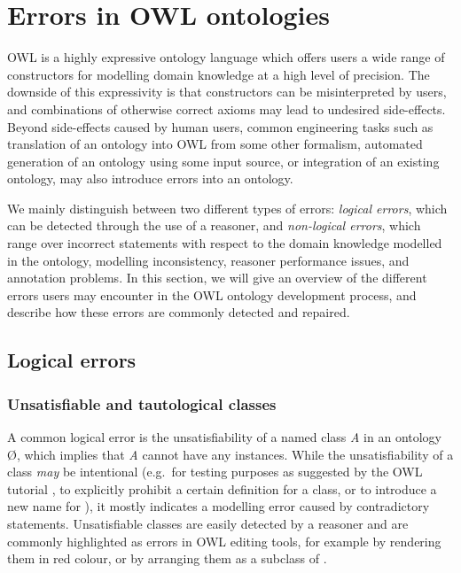 \section{Errors in OWL ontologies}

OWL is a highly expressive ontology language which offers users a wide range of constructors for modelling domain knowledge at a high level of precision. The downside of this expressivity is that constructors can be misinterpreted by users, and combinations of otherwise correct axioms may lead to undesired side-effects. Beyond side-effects caused by human users, common engineering tasks such as translation of an ontology into OWL from some other formalism, automated generation of an ontology using some input source, or integration of an existing ontology, may also introduce errors into an ontology.

We mainly distinguish between two different types of errors: \emph{logical errors}, which can be detected through the use of a reasoner, and \emph{non-logical errors}, which range over incorrect statements with respect to the domain knowledge modelled in the ontology, modelling inconsistency, reasoner performance issues, and annotation problems. In this section, we will give an overview of the different errors users may encounter in the OWL ontology development process, and describe how these errors are commonly detected and repaired.

\subsection{Logical errors}

\subsubsection{Unsatisfiable and tautological classes}
A common logical error is the unsatisfiability of a named class \emph{A} in an ontology \O, which implies that \emph{A} cannot have any instances. While the unsatisfiability of a class \emph{may} be intentional (e.g.\ for testing purposes as suggested by the \protege OWL tutorial \cite{horridge11aa}, to explicitly prohibit a certain definition for a class, or to introduce a new name for \nothing), it mostly indicates a modelling error caused by contradictory statements. Unsatisfiable classes are easily detected by a reasoner and are commonly highlighted as errors in OWL editing tools, for example by rendering them in red colour, or by arranging them as a subclass of \nothing.

